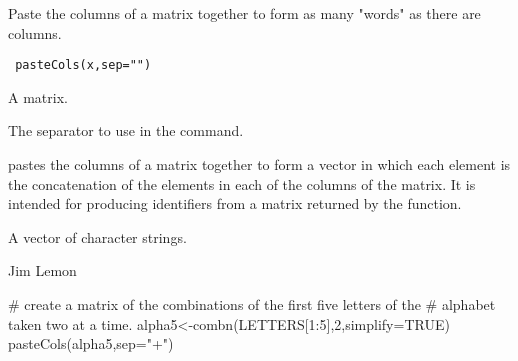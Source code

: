 \begin{Description}\relax
Paste the columns of a matrix together to form as
many "words" as there are columns.
\end{Description}
\begin{Usage}
\begin{verbatim}
 pasteCols(x,sep="")
\end{verbatim}
\end{Usage}
\begin{Arguments}
\begin{ldescription}
\item[\code{x}] A matrix.
\item[\code{sep}] The separator to use in the  command.
\end{ldescription}
\end{Arguments}
\begin{Details}\relax
{} pastes the columns of a matrix together to form a vector in
which each element is the concatenation of the elements in each of the columns
of the matrix. It is intended for producing identifiers from a matrix returned
by the  function.
\end{Details}
\begin{Value}
A vector of character strings.
\end{Value}
\begin{Author}\relax
Jim Lemon
\end{Author}
\begin{SeeAlso}\relax
{}
\end{SeeAlso}
\begin{Examples}
\begin{ExampleCode}
 # create a matrix of the combinations of the first five letters of the
 # alphabet taken two at a time.
 alpha5<-combn(LETTERS[1:5],2,simplify=TRUE)
 pasteCols(alpha5,sep="+")
\end{ExampleCode}
\end{Examples}

